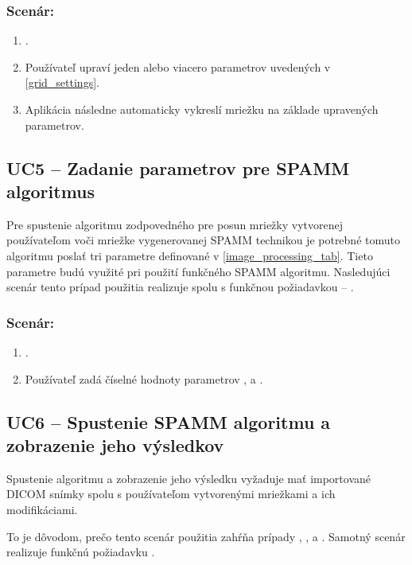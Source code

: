 \subsubsection*{Scenár:}
\begin {enumerate}
\item {.}
\item {Používateľ upraví jeden alebo viacero parametrov uvedených v \ref{grid_settings}.}
\item {Aplikácia následne automaticky vykreslí mriežku na základe upravených parametrov.}
\end {enumerate}

\subsection {UC5 -- Zadanie parametrov pre SPAMM algoritmus}\label{uc5}
Pre spustenie algoritmu zodpovedného pre posun mriežky vytvorenej používateľom voči mriežke vygenerovanej SPAMM technikou je potrebné tomuto algoritmu poslať tri parametre definované v \ref{image_processing_tab}. Tieto parametre budú využité pri použití funkčného SPAMM algoritmu. Nasledujúci scenár tento prípad použitia realizuje spolu s funkčnou požiadavkou -- .

\subsubsection*{Scenár:}
\begin {enumerate}
\item {.}
\item {Používateľ zadá číselné hodnoty parametrov , \newline {} a .}
\end {enumerate}

\subsection {UC6 -- Spustenie SPAMM algoritmu a zobrazenie jeho výsledkov}\label{uc6}
Spustenie algoritmu a zobrazenie jeho výsledku vyžaduje mať importované DICOM snímky spolu s používateľom vytvorenými mriežkami a ich modifikáciami.

To je dôvodom, prečo tento scenár použitia zahŕňa prípady , ,  a . Samotný scenár realizuje funkčnú požiadavku .

